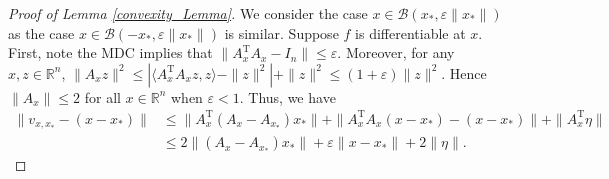 \documentclass[11pt]{article}
\newcommand{\R}{\mathbb{R}}
\newcommand{\T}{\mathrm{T}}
\renewcommand{\epsilon}{\varepsilon}
\begin{document}
\begin{proof}[Proof of Lemma \ref{convexity_Lemma}] We consider the case $x \in \mathcal{B}(x_*,\epsilon\|x_*\|)$ as the case $x \in \mathcal{B}(-x_*,\epsilon\|x_*\|)$ is similar. Suppose $f$ is differentiable at $x$. First, note the MDC implies that $\|A_x^{\T}A_x-I_n\|\leqslant \epsilon$. Moreover, for any $x,z \in \R^n$, $\|A_xz\|^2\leqslant |\langle A_x^{\T}A_xz,z\rangle - \|z\|^2| + \|z\|^2 \leqslant (1+\epsilon)\|z\|^2$. Hence $\|A_x\|\leqslant2$ for all $x \in \R^n$ when $\epsilon < 1$. Thus, we have \begin{align}
    \|v_{x,x_*} - (x-x_*)\| & \leqslant \|A_{x}^{\T}(A_x - A_{x_*})x_*\| +\|A_{x}^{\T}A_x(x - x_*) - (x-x_*)\| + \|A_{x}^{\T}\eta\| \nonumber\\
    & \leqslant 2\|(A_x - A_{x_*})x_*\| + \epsilon\|x-x_*\| + 2\|\eta\|. \label{v_xx*_to_x_x*_firstbound}
\end{align}


\end{proof}
\end{document}
